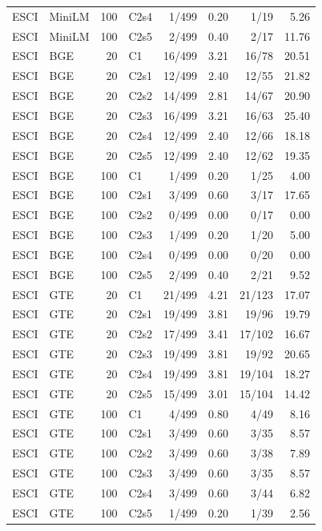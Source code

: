 \begin{longtable}{llrlrrrr}
ESCI & MiniLM & 100 & C2s4 & 1/499 & 0.20 & 1/19 & 5.26 \\
ESCI & MiniLM & 100 & C2s5 & 2/499 & 0.40 & 2/17 & 11.76 \\
ESCI & BGE & 20 & C1 & 16/499 & 3.21 & 16/78 & 20.51 \\
ESCI & BGE & 20 & C2s1 & 12/499 & 2.40 & 12/55 & 21.82 \\
ESCI & BGE & 20 & C2s2 & 14/499 & 2.81 & 14/67 & 20.90 \\
ESCI & BGE & 20 & C2s3 & 16/499 & 3.21 & 16/63 & 25.40 \\
ESCI & BGE & 20 & C2s4 & 12/499 & 2.40 & 12/66 & 18.18 \\
ESCI & BGE & 20 & C2s5 & 12/499 & 2.40 & 12/62 & 19.35 \\
ESCI & BGE & 100 & C1 & 1/499 & 0.20 & 1/25 & 4.00 \\
ESCI & BGE & 100 & C2s1 & 3/499 & 0.60 & 3/17 & 17.65 \\
ESCI & BGE & 100 & C2s2 & 0/499 & 0.00 & 0/17 & 0.00 \\
ESCI & BGE & 100 & C2s3 & 1/499 & 0.20 & 1/20 & 5.00 \\
ESCI & BGE & 100 & C2s4 & 0/499 & 0.00 & 0/20 & 0.00 \\
ESCI & BGE & 100 & C2s5 & 2/499 & 0.40 & 2/21 & 9.52 \\
ESCI & GTE & 20 & C1 & 21/499 & 4.21 & 21/123 & 17.07 \\
ESCI & GTE & 20 & C2s1 & 19/499 & 3.81 & 19/96 & 19.79 \\
ESCI & GTE & 20 & C2s2 & 17/499 & 3.41 & 17/102 & 16.67 \\
ESCI & GTE & 20 & C2s3 & 19/499 & 3.81 & 19/92 & 20.65 \\
ESCI & GTE & 20 & C2s4 & 19/499 & 3.81 & 19/104 & 18.27 \\
ESCI & GTE & 20 & C2s5 & 15/499 & 3.01 & 15/104 & 14.42 \\
ESCI & GTE & 100 & C1 & 4/499 & 0.80 & 4/49 & 8.16 \\
ESCI & GTE & 100 & C2s1 & 3/499 & 0.60 & 3/35 & 8.57 \\
ESCI & GTE & 100 & C2s2 & 3/499 & 0.60 & 3/38 & 7.89 \\
ESCI & GTE & 100 & C2s3 & 3/499 & 0.60 & 3/35 & 8.57 \\
ESCI & GTE & 100 & C2s4 & 3/499 & 0.60 & 3/44 & 6.82 \\
ESCI & GTE & 100 & C2s5 & 1/499 & 0.20 & 1/39 & 2.56 \\
\bottomrule
\end{longtable}
